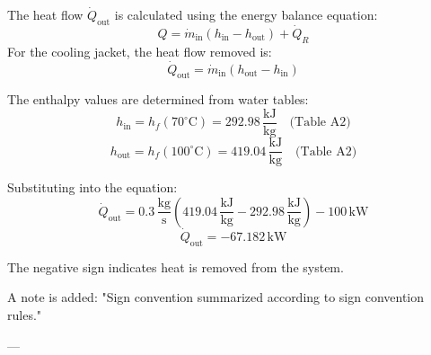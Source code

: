 The heat flow \( \dot{Q}_{\text{out}} \) is calculated using the energy balance equation:  
\[
Q = \dot{m}_{\text{in}} (h_{\text{in}} - h_{\text{out}}) + \dot{Q}_R
\]  
For the cooling jacket, the heat flow removed is:  
\[
\dot{Q}_{\text{out}} = \dot{m}_{\text{in}} (h_{\text{out}} - h_{\text{in}})
\]  

The enthalpy values are determined from water tables:  
\[
h_{\text{in}} = h_f(70^\circ\text{C}) = 292.98 \, \frac{\text{kJ}}{\text{kg}} \quad \text{(Table A2)}
\]  
\[
h_{\text{out}} = h_f(100^\circ\text{C}) = 419.04 \, \frac{\text{kJ}}{\text{kg}} \quad \text{(Table A2)}
\]  

Substituting into the equation:  
\[
\dot{Q}_{\text{out}} = 0.3 \, \frac{\text{kg}}{\text{s}} \left( 419.04 \, \frac{\text{kJ}}{\text{kg}} - 292.98 \, \frac{\text{kJ}}{\text{kg}} \right) - 100 \, \text{kW}
\]  
\[
\dot{Q}_{\text{out}} = -67.182 \, \text{kW}
\]  

The negative sign indicates heat is removed from the system.  

A note is added: "Sign convention summarized according to sign convention rules."  

---